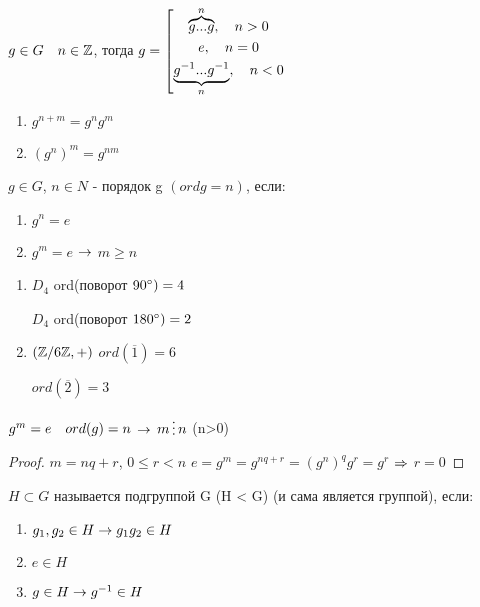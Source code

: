 \documentclass[main]{subfiles}
\begin{document}
  \begin{definition}
      $g \in G \quad n \in \mathbb{Z}$, тогда $g=
  \left[
    \begin{gathered}
      \overbrace{g...g}^n, \quad n>0\\
      e, \quad n=0\\
      \underbrace{g^{-1}...g^{-1}}_n, \quad n<0
    \end{gathered}
  \right.$
  \end{definition}

  \begin{theorem}[св-ва степени]
      \begin{enumerate}
      	\item $g^{n+m}=g^n g^m$
      	\item $(g^n)^m=g^{n m}$
  	\end{enumerate}
  \end{theorem}

  \begin{definition}
      $g \in G$, $n \in N$ - порядок g $(ord g = n)$, если:
      \begin{enumerate}
      	\item $g^n=e$
      	\item $g^m=e$ $\rightarrow$ $m \geqslant n$
  	\end{enumerate}
  \end{definition}

  \begin{examples}
      \begin{enumerate}
      	\item $D_4$ ord(поворот $90\degree) =4$

      	$D_4$ ord(поворот $180\degree) =2$
      	\item $(\mathbb{Z} /6 \mathbb{Z}, +)$ $ord(\overline{1})=6$

      	$ord(\overline{2})=3$
  	\end{enumerate}
  \end{examples}

  \begin{utv}
      $g^m=e \quad ord(g)=n$ $\rightarrow$ $m \devides n$ (n>0)
  \end{utv}

  \begin{proof}
      $m=n q+r$, $0 \leqslant r < n$
      $e=g^m=g^{n q + r}=(g^n)^q g^r=g^r$ $\Rightarrow$ $r=0$
  \end{proof}

  \begin{definition}
      $H \subset G$ называется подгруппой G (H < G) (и сама является группой), если:
      \begin{enumerate}
      	\item $g_1,g_2 \in H \rightarrow g_1 g_2 \in H$
      	\item $e \in H$
      	\item $g \in H \rightarrow g^{-1} \in H$
  	\end{enumerate}
  \end{definition}
\end{document}
